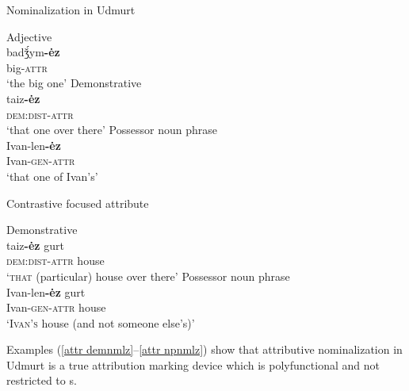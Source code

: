 \begin{exe}
\ex \rm{Nominalization in Udmurt \citep{winkler2001}}
\begin{xlist}
\ex \rm{Adjective}\\
\gll	badǯ́ym\textbf{-ėz}\\
	big-\textsc{attr}\\
\glt	 ‘the big one’
\ex \rm{Demonstrative}\\
\gll	taiz\textbf{-ėz}\\
 	\textsc{dem:dist}-\textsc{attr}\\
\glt	‘that one over there’
\ex \rm{Possessor noun phrase}\\
\gll	Ivan-len\textbf{-ėz}\\
	Ivan-\textsc{gen}-\textsc{attr}\\
\glt	‘that one of Ivan's’
\end{xlist}
\ex \rm{Contrastive focused attribute}
\begin{xlist}
\ex \rm{Demonstrative}\\ 
\label{attr demnmlz}
\gll	taiz\textbf{-ėz} gurt\\
 	\textsc{dem:dist}-\textsc{attr} house\\
\glt	‘\textsc{that} (particular) house over there’
\ex \rm{Possessor noun phrase}\\ 
\label{attr npnmlz}
\gll	Ivan-len\textbf{-ėz} gurt\\
	Ivan-\textsc{gen}-\textsc{attr} house\\
\glt	‘\textsc{Ivan's} house (and not someone else's)’
\end{xlist}
\end{exe}
Examples (\ref{attr demnmlz}–\ref{attr npnmlz}) show that attributive nominalization in Udmurt is a true attribution marking device which is polyfunctional and not restricted to s.


